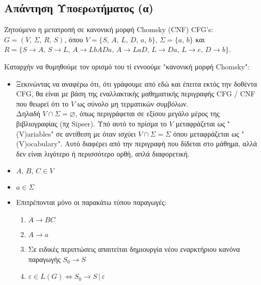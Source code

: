 \subsection{Απάντηση Υποερωτήματος (α)}
\label{ssec:Solution_4.1}
\doublespacing

Ζητούμενο η μετατροπή σε κανονική μορφή Chomsky (CNF) CFG's:\\
 $G = (V,\, \Sigma,\, R,\, S)$, όπου $V=\{S,\,A,\,L,\,D,\,a,\,b\}$, $\Sigma=\{a,\,b\}$ και \\
$R=\{S\rightarrow A,\,S\rightarrow L,\,A\rightarrow LbADa,\,A\rightarrow LaD,\,L\rightarrow Da,\,L\rightarrow
e,\,D\rightarrow b\}$.

\par
Καταρχήν να θυμηθούμε τον ορισμό του τί εννοούμε "κανονική μορφή Chomsky":

\begin{itemize}
	\itemsep0em

	\item Ξεκινώντας να αναφέρω ότι, ότι γράφουμε από εδώ και έπειτα εκτός την δοθέντα CFG, θα είναι με βάση της
	εναλλακτικής μαθηματικής περιγραφής CFG / CNF που θεωρεί ότι το $V$ ως σύνολο μη τερματικών συμβόλων.\\
	Δηλαδή $V\cap\Sigma = \varnothing$, όπως περιγράφεται σε εξίσου μεγάλο μέρος της βιβλιογραφίας (πχ Sipser). Υπό
	αυτό το πρίσμα το $V$ μεταφράζεται ως "(V)ariables" σε αντίθεση με όταν ισχύει $V\cap\Sigma = \Sigma$ όπου
	μεταφράζεται ως "(V)ocabulary". Αυτό διαφέρει από την περιγραφή που δίδεται στο μάθημα, αλλά δεν είναι λιγότερο
	ή περισσότερο ορθή, απλά διαφορετική.

	\item $A,\, B,\, C \in V$

	\item $a \in \Sigma$

	\item Επιτρέπονται μόνο οι παρακάτω τύπου παραγωγές:
		\begin{enumerate}
			\item $A\rightarrow BC$

			\item $A\rightarrow a$

			\item Σε ειδικές περιπτώσεις απαιτείται δημιουργία νέου εναρκτήριου κανόνα παραγωγής $S_0\rightarrow S$

			\item $\varepsilon \in L(G) \Leftrightarrow S_0\rightarrow S \,|\, \varepsilon$
		\end{enumerate}

\end{itemize}



